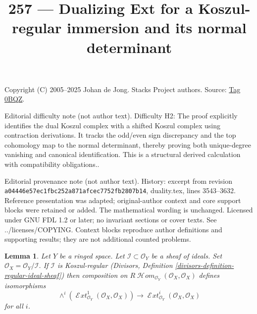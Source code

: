 \documentclass{amsart}
\theoremstyle{plain}
\newtheorem{lemma}[subsection]{Lemma}
\theoremstyle{definition}
\theoremstyle{remark}
\numberwithin{equation}{subsection}
\def\SheafHom{\mathop{\mathcal{H}\!\mathit{om}}\nolimits}
\def\SheafExt{\mathop{\mathcal{E}\!\mathit{xt}}\nolimits}
\begin{document}
\title[Stacks Project, Tag 0BQZ]{257 --- Dualizing Ext for a Koszul-regular immersion and its normal determinant}
\maketitle
\noindent Copyright (C) 2005--2025 Johan de Jong. Stacks Project authors. Source: \href{https://stacks.math.columbia.edu/tag/0BQZ}{Tag 0BQZ}.

\noindent Editorial difficulty note (not author text). Difficulty H2: The proof explicitly identifies the dual Koszul complex with a shifted Koszul complex using contraction derivations. It tracks the odd/even sign discrepancy and the top cohomology map to the normal determinant, thereby proving both unique-degree vanishing and canonical identification. This is a structural derived calculation with compatibility obligations..

\noindent Editorial provenance note (not author text). History: excerpt from revision \texttt{a0444\allowbreak 6e57e\allowbreak c1fbc\allowbreak 252a8\allowbreak 71afc\allowbreak ec775\allowbreak 2fb28\allowbreak 07b14}, duality.tex, lines 3543--3632. Reference presentation was adapted; original-author context and core support blocks were retained or added. The mathematical wording is unchanged. Licensed under GNU FDL 1.2 or later; no invariant sections or cover texts. See ../licenses/COPYING. Context blocks reproduce author definitions and supporting results; they are not additional counted problems.

\begin{lemma}
\label{lemma-regular-ideal-ext}
Let $Y$ be a ringed space. Let $\mathcal{I} \subset \mathcal{O}_Y$
be a sheaf of ideals. Set $\mathcal{O}_X = \mathcal{O}_Y/\mathcal{I}$.
If $\mathcal{I}$ is Koszul-regular
(Divisors, Definition \ref{divisors-definition-regular-ideal-sheaf})
then composition on $R\SheafHom_{\mathcal{O}_Y}(\mathcal{O}_X, \mathcal{O}_X)$
defines isomorphisms
$$
\wedge^i(\SheafExt^1_{\mathcal{O}_Y}(\mathcal{O}_X, \mathcal{O}_X))
\longrightarrow
\SheafExt^i_{\mathcal{O}_Y}(\mathcal{O}_X, \mathcal{O}_X)
$$
for all $i$.
\end{lemma}
\end{document}
